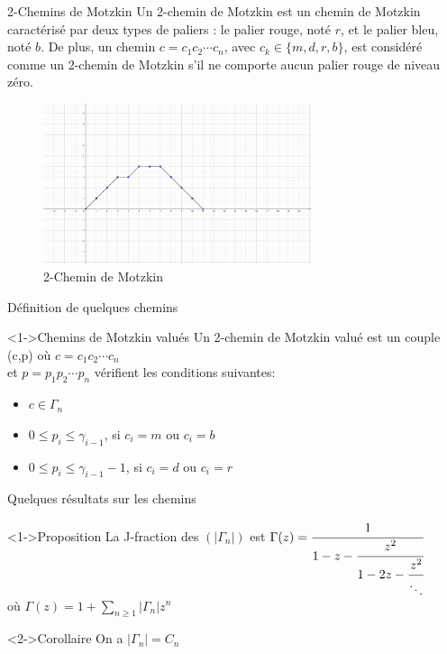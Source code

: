 \begin{frame}
    \begin{block}{2-Chemins de Motzkin}
        Un 2-chemin de Motzkin est un chemin de Motzkin caractérisé par deux types de paliers : le palier rouge, noté $r$, et le palier bleu, noté $b$. De plus, un chemin $c = c_{1}c_{2}\cdots c_{n}$, avec $c_{k} \in \{m, d, r, b\}$, est considéré comme un 2-chemin de Motzkin s'il ne comporte aucun palier rouge de niveau zéro.
    \end{block}
    \begin{figure}
        \centering
        \includegraphics[width=0.7\textwidth]{./images/2-chemin Motzkin.png}
        \caption{2-Chemin de Motzkin}
        \label{fig:example}
      \end{figure}
\end{frame}

\begin{frame}{Définition de quelques chemins}
    \transfade
    \begin{block}<1->{Chemins de Motzkin valués}
            Un 2-chemin de Motzkin valué est un couple (c,p) où $c = c_{1}c_{2}\cdots c_{n}$\\ et $p = p_{1}p_{2}\cdots p_{n}$
            vérifient les conditions suivantes:
            \begin{itemize}
                \item$c \in \Gamma_{n}$
                \item$0\leq p_{i}\leq \gamma_{i-1}$, si $c_{i}=m\text{ ou }c_{i}=b$
                \item $0\leq p_{i}\leq \gamma_{i-1} - 1$, si  $c_{i}=d\text{ ou }c_{i}=r$
            \end{itemize}
    \end{block}
\end{frame}

\begin{frame}[t]{Quelques résultats sur les chemins}
    \begin{block}<1->{Proposition}
        La J-fraction des $(|\Gamma_{n}|)$ est $\Gamma(z) = \cfrac{1}{1-z-\cfrac{z^2}{1-2z-\cfrac{z^2}{\ddots}}}$\\
        \vspace{7pt} où $\Gamma(z)=1+\sum\limits_{n\geq 1}|\Gamma_{n}|z^n$
    \end{block}

    \begin{block}<2->{Corollaire}
        On a $|\Gamma_{n}|=C_{n}$
    \end{block}
\end{frame}


